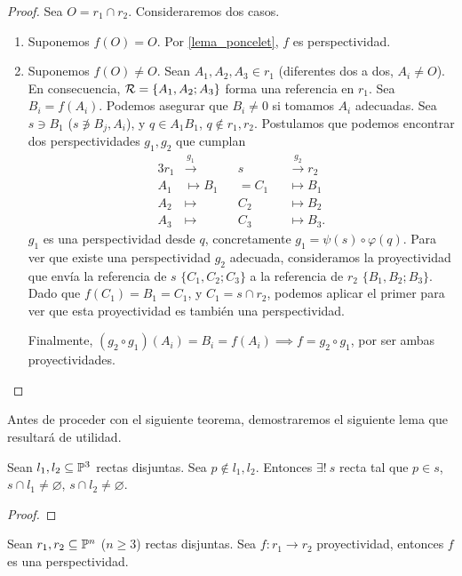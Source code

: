 \begin{proof} %
    Sea $O = r_1 \cap r_2$. Consideraremos dos casos.
    \begin{enumerate}
        \item Suponemos $f(O) = O$. Por \ref{lema_poncelet}, 
        $f$ es perspectividad.
        \item Suponemos $f(O) \neq O$. Sean $A_1, A_2, A_3 \in r_1$
        (diferentes dos a dos, $A_i \neq O$). En consecuencia,
        $\mathcal{R} = \{A_1, A_2; A_3\}$ forma una referencia en $r_1$.
        Sea $B_i = f(A_i)$. Podemos asegurar que $B_i \neq 0$
        si tomamos $A_i$ adecuadas. Sea $s \ni B_1$ ($ s 
        \not \ni B_j, A_i$), y $q \in A_1B_1$, $q \not
        \in r_1, r_2$. Postulamos que podemos encontrar
        dos perspectividades $g_1, g_2$ que cumplan
        \begin{alignat*}{3}
            r_1 &\stackrel{g_1}\longrightarrow &&s&&
            \stackrel{g_2}\longrightarrow r_2\\
            A_1 &\longmapsto B_1&&=C_1 &&\longmapsto B_1\\
            A_2 &\longmapsto &&C_2&&\longmapsto B_2\\
            A_3 &\longmapsto &&C_3&&\longmapsto B_3.
        \end{alignat*}
        $g_1$ es una perspectividad desde $q$, concretamente
        $g_1 = \psi(s) \circ \varphi(q)$. Para ver que existe
        una perspectividad $g_2$ adecuada, consideramos la
        proyectividad que envía la referencia de $s$
        $\{C_1, C_2; C_3\}$ a la referencia de $r_2$ $\{B_1,
        B_2; B_3\}$. Dado que $f(C_1) = B_1 = C_1$, y $C_1 = 
        s \cap r_2$, podemos aplicar el primer para ver que 
        esta proyectividad es también una perspectividad.
        
        Finalmente, $(g_2 \circ g_1)(A_i) = B_i = f(A_i) \implies
        f = g_2 \circ g_1$, por ser ambas proyectividades.
        
    \end{enumerate}
\end{proof}

Antes de proceder con el siguiente teorema, demostraremos
el siguiente lema que resultará de utilidad.

\begin{lema} %
    Sean $l_1, l_2 \subseteq \mathbb{P}^3$ rectas disjuntas. Sea $p \not \in 
    l_1, l_2$. Entonces $\exists! \: s$ recta 
    tal que $p \in s$, $s \cap l_1 \neq \varnothing$, 
    $s \cap l_2 \neq \varnothing$.
\end{lema}
\begin{proof}
    
\end{proof}
\begin{teo} %
    Sean $r_1, r_2 \subseteq \mathbb{P}^n$ ($n \geq 3$) rectas disjuntas.
    Sea $f \colon r_1 \to r_2$ proyectividad, entonces $f$
    es una perspectividad. 
\end{teo}

